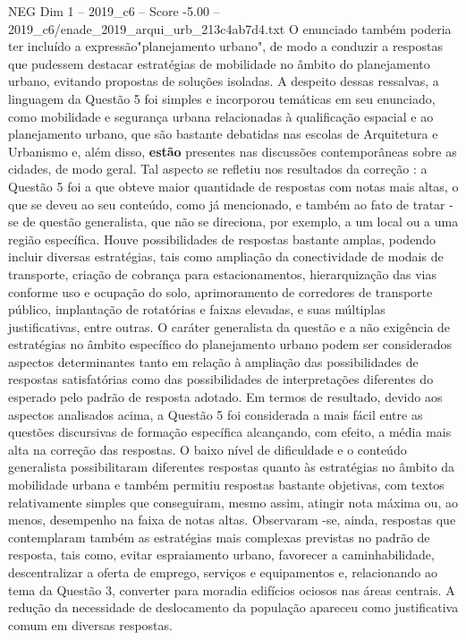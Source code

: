 \begin{textsample}{NEG Dim 1 – 2019\_c6 – Score -5.00 – 2019\_c6/enade\_2019\_arqui\_urb\_213c4ab7d4.txt}
O enunciado também poderia ter incluído a expressão"planejamento urbano", de modo a conduzir a respostas que pudessem destacar estratégias de mobilidade no âmbito do planejamento urbano, evitando propostas de soluções isoladas.
A despeito dessas ressalvas, a linguagem da Questão 5 foi simples e incorporou temáticas em seu enunciado, como mobilidade e segurança urbana relacionadas à qualificação espacial e ao planejamento urbano, que são bastante debatidas nas escolas de Arquitetura e Urbanismo e, além disso, \textbf{estão} presentes nas discussões contemporâneas sobre as cidades, de modo geral.
Tal aspecto se refletiu nos resultados da correção : a Questão 5 foi a que obteve maior quantidade de respostas com notas mais altas, o que se deveu ao seu conteúdo, como já mencionado, e também ao fato de tratar -se de questão generalista, que não se direciona, por exemplo, a um local ou a uma região específica.
Houve possibilidades de respostas bastante amplas, podendo incluir diversas estratégias, tais como ampliação da conectividade de modais de transporte, criação de cobrança para estacionamentos, hierarquização das vias conforme uso e ocupação do solo, aprimoramento de corredores de transporte público, implantação de rotatórias e faixas elevadas, e suas múltiplas justificativas, entre outras.
O caráter generalista da questão e a não exigência de estratégias no âmbito específico do planejamento urbano podem ser considerados aspectos determinantes tanto em relação à ampliação das possibilidades de respostas satisfatórias como das possibilidades de interpretações diferentes do esperado pelo padrão de resposta adotado.
Em termos de resultado, devido aos aspectos analisados acima, a Questão 5 foi considerada a mais fácil entre as questões discursivas de formação específica alcançando, com efeito, a média mais alta na correção das respostas.
O baixo nível de dificuldade e o conteúdo generalista possibilitaram diferentes respostas quanto às estratégias no âmbito da mobilidade urbana e também permitiu respostas bastante objetivas, com textos relativamente simples que conseguiram, mesmo assim, atingir nota máxima ou, ao menos, desempenho na faixa de notas altas.
Observaram -se, ainda, respostas que contemplaram também as estratégias mais complexas previstas no padrão de resposta, tais como, evitar espraiamento urbano, favorecer a caminhabilidade, descentralizar a oferta de emprego, serviços e equipamentos e, relacionando ao tema da Questão 3, converter para moradia edifícios ociosos nas áreas centrais.
A redução da necessidade de deslocamento da população apareceu como justificativa comum em diversas respostas.

\end{textsample}
